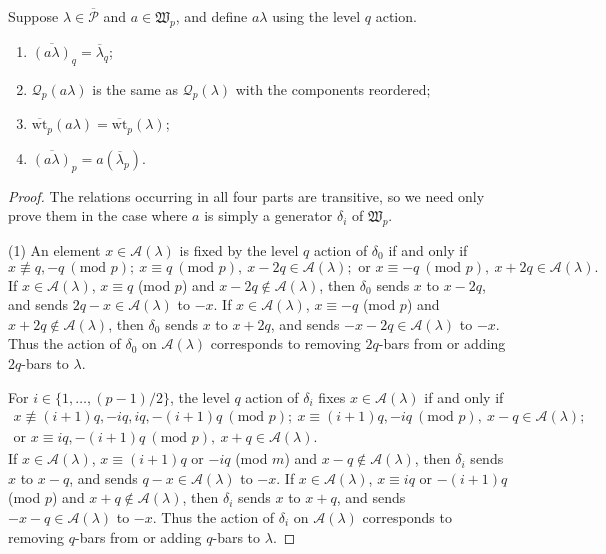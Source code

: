 \documentclass[ALCO, Unicode,published]{cedram}
\newcommand*\nicefrac[2]{#1/#2}
\begin{document}
\begin{lemm}\label{lem4} 
Suppose $\lambda\in\overline{\mathcal{P}}$ and $a\in\mathfrak{W}_p$, and define $a\lambda$ using the level $q$ action. 
\begin{enumerate}
\item $\overline{(a\lambda)}_q=\overline{\lambda}_q$; 
\item $\mathcal{Q}_p(a\lambda)$ is the same as $\mathcal{Q}_p(\lambda)$ with the components reordered; 
\item $\overline{\text{wt}}_p(a\lambda)=\overline{\text{wt}}_p(\lambda)$; 
\item $\overline{(a\lambda)}_p=a(\overline{\lambda}_p)$.
\end{enumerate}
\end{lemm}
\begin{proof}
The relations occurring in all four parts are transitive, so we need only prove them in the case where $a$ is simply a generator $\delta_i$ of $\mathfrak{W}_p$. 

\smallskip
\noindent
(1) An element $x\in\mathcal{A}(\lambda)$ is fixed by the level $q$ action of $\delta_0$ if and only if 
$$x\not\equiv q,-q\:(\text{mod }p);\:x\equiv q\:(\text{mod }p),\:x-2q\in\mathcal{A}(\lambda);\text{ or }x\equiv-q\:(\text{mod }p),\:x+2q\in\mathcal{A}(\lambda).$$ 
If $x\in\mathcal{A}(\lambda)$, $x\equiv q$ (mod $p$) and $x-2q\not\in\mathcal{A}(\lambda)$, then $\delta_0$ sends $x$ to $x-2q$, and sends $2q-x\in\mathcal{A}(\lambda)$ to $-x$. If $x\in\mathcal{A}(\lambda)$, $x\equiv-q$ (mod $p$) and $x+2q\not\in\mathcal{A}(\lambda)$, then $\delta_0$ sends $x$ to $x+2q$, and sends $-x-2q\in\mathcal{A}(\lambda)$ to $-x$. Thus the action of $\delta_0$ on $\mathcal{A}(\lambda)$ corresponds to removing $2q$-bars from or adding $2q$-bars to $\lambda$. 

For $i\in\{1,\dots,\nicefrac{(p-1)}{2}\}$, the level $q$ action of $\delta_i$ fixes $x\in\mathcal{A}(\lambda)$ if and only if 
\begin{align*}x\not\equiv(i+1)q,-iq,iq,-(i+1)q\:(\text{mod }p);\:x\equiv(i+1)q,-iq\:(\text{mod }p),\:x-q\in\mathcal{A}(\lambda);\\
\text{or }x\equiv iq,-(i+1)q\:(\text{mod }p),\:x+q\in\mathcal{A}(\lambda).\end{align*} 
If $x\in\mathcal{A}(\lambda)$, $x\equiv(i+1)q$ or $-iq$ (mod $m$) and $x-q\not\in\mathcal{A}(\lambda)$, then $\delta_i$ sends $x$ to $x-q$, and sends $q-x\in\mathcal{A}(\lambda)$ to $-x$. If $x\in\mathcal{A}(\lambda)$, $x\equiv iq$ or $-(i+1)q$ (mod $p$) and $x+q\not\in\mathcal{A}(\lambda)$, then $\delta_i$ sends $x$ to $x+q$, and sends $-x-q\in\mathcal{A}(\lambda)$ to $-x$. Thus the action of $\delta_i$ on $\mathcal{A}(\lambda)$ corresponds to removing $q$-bars from or adding $q$-bars to $\lambda$. 


\end{proof}
\end{document}
